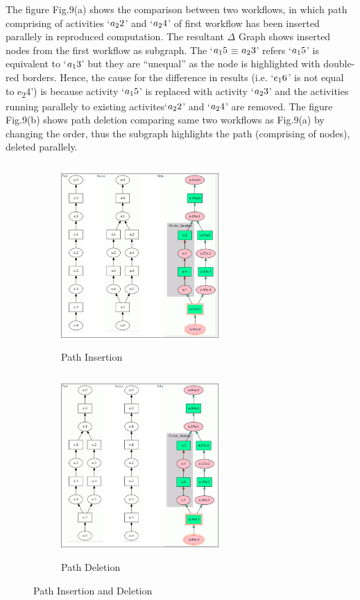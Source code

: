 \documentclass[10pt,conference,twocolumn]{IEEEtran}
\begin{document}
The figure Fig.9(a) shows the comparison between two workflows, in which path comprising of activities `$a\textsubscript{2}2$' and `$a\textsubscript{2}4$' of first workflow has been inserted parallely in reproduced computation. The resultant $\Delta$ Graph shows inserted nodes from the first workflow as subgraph. The `$a\textsubscript{1}5$$\equiv$$a\textsubscript{2}3$' refers `$a\textsubscript{1}5$' is equivalent to `$a\textsubscript{1}3$' but they are \enquote{unequal} as the node is highlighted with double-red borders. Hence, the cause for the difference in results (i.e. `$e\textsubscript{1}6$' is not equal to  e\textsubscript{2}4') is because activity `$a\textsubscript{1}5$'  is replaced with activity `$a\textsubscript{2}3$' and the activities running parallely to existing activites`$a\textsubscript{2}2$' and `$a\textsubscript{2}4$' are removed. The figure Fig.9(b) shows path deletion comparing same two workflows as Fig.9(a) by changing the order, thus the subgraph highlights the path (comprising of nodes), deleted parallely.

\begin{figure}
\centering
\begin{subfigure}{.50\textwidth}
  \centering
  \includegraphics[width=6cm,height=7cm]{DeltaPathInsertion.png}
  \caption{Path Insertion}
  \label{fig:Path Insertion}
\end{subfigure}%
\begin{subfigure}{.50\textwidth}
    \centering
  \includegraphics[width=6cm,height=7cm]{DeltaPathDeletion.png}
  \caption{Path Deletion}
  \label{fig:Path Deletion}
\end{subfigure}
\label{fig:test}
\caption{Path Insertion and Deletion}
\end{figure}
\end{document}
